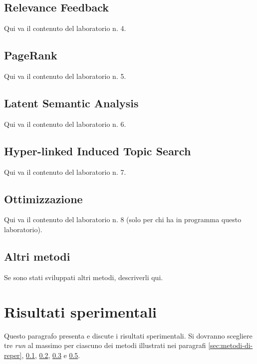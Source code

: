\documentclass{llncs}
\begin{document}
\subsection{Relevance Feedback}
\label{sec:relevance-feedback}

Qui va il contenuto del laboratorio n. 4.

\subsection{PageRank}
\label{sec:pagerank}

Qui va il contenuto del laboratorio n. 5.

\subsection{Latent Semantic Analysis}
\label{sec:lsa}

Qui va il contenuto del laboratorio n. 6.

\subsection{Hyper-linked Induced Topic Search}
\label{sec:hits}

Qui va il contenuto del laboratorio n. 7.

\subsection{Ottimizzazione}
\label{sec:hits}

Qui va il contenuto del laboratorio n. 8 (solo per chi ha in programma questo
laboratorio). 

\subsection{Altri metodi}
\label{sec:altri-metodi}

Se sono stati sviluppati altri metodi, descriverli qui.

\section{Risultati sperimentali}
\label{sec:risult-sper}

Questo paragrafo presenta e discute i risultati sperimentali. Si dovranno
scegliere tre \textit{run} al massimo per ciascuno dei metodi illustrati nei
paragrafi \ref{sec:metodi-di-reper}, \ref{sec:relevance-feedback},
\ref{sec:pagerank}, \ref{sec:lsa} e \ref{sec:hits}.  
\end{document}
